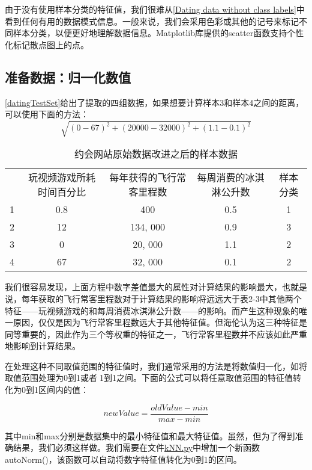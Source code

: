 由于没有使用样本分类的特征值，我们很难从\autoref{Dating data without class labels}中看到任何有用的数据模式信息。一般来说，我们会采用色彩或其他的记号来标记不同样本分类，以便更好地理解数据信息。Matplotlib库提供的scatter函数支持个性化标记散点图上的点。

\subsection{准备数据：归一化数值}
\autoref{datingTestSet}给出了提取的四组数据，如果想要计算样本3和样本4之间的距离，可以使用下面的方法：
$$\sqrt{(0-67)^2 + (20000-32000)^2+(1.1-0.1)^2}$$
\begin{table}[H]
    \centering
    \caption{约会网站原始数据改进之后的样本数据}
    \label{datingTestSet}
    \begin{tabular}{ccccc}
        \hline
          & 玩视频游戏所耗时间百分比 & 每年获得的飞行常客里程数 & 每周消费的冰淇淋公升数 & 样本分类 \\
        1 & 0.8          & 400          & 0.5         & 1    \\
        2 & 12           & 134, 000     & 0.9         & 3    \\
        3 & 0            & 20, 000      & 1.1         & 2    \\
        4 & 67           & 32, 000      & 0.1         & 2    \\
        \hline
    \end{tabular}
\end{table}

我们很容易发现，上面方程中数字差值最大的属性对计算结果的影响最大，也就是说，每年获取的飞行常客里程数对于计算结果的影响将远远大于表2-3中其他两个特征——玩视频游戏的和每周消费冰淇淋公升数——的影响。而产生这种现象的唯一原因，仅仅是因为飞行常客里程数远大于其他特征值。但海伦认为这三种特征是同等重要的，因此作为三个等权重的特征之一，飞行常客里程数并不应该如此严重地影响到计算结果。

在处理这种不同取值范围的特征值时，我们通常采用的方法是将数值归一化，如将取值范围处理为0到1或者1到1之间。下面的公式可以将任意取值范围的特征值转化为0到1区间内的值：

$$newValue = \frac{oldValue-min}{max-min}$$

其中min和max分别是数据集中的最小特征值和最大特征值。虽然，但为了得到准确结果，我们必须这样做。我们需要在文件\href{https://github.com/JPL-JUNO/Machine-Learning-in-Action/blob/main/Codes/kNN.py}{kNN.py}中增加一个新函数autoNorm()，该函数可以自动将数字特征值转化为0到1的区间。

